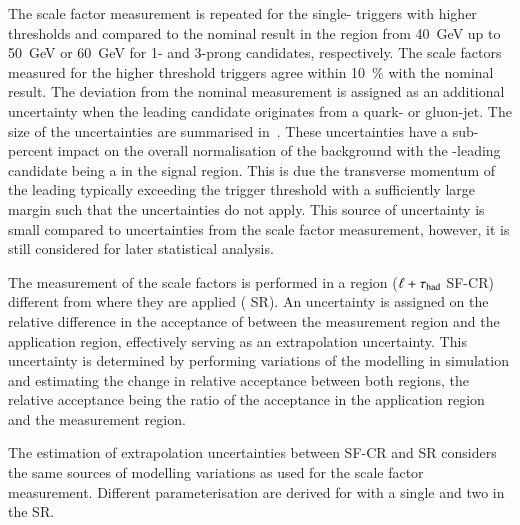 The scale factor measurement is repeated for the single-\tauhadvis
triggers with higher thresholds and compared to the nominal result in
the \faketauhadvis \pT region from \SI{40}{\GeV} up to \SI{50}{\GeV}
or \SI{60}{\GeV} for 1- and 3-prong candidates, respectively. The
scale factors measured for the higher threshold triggers agree within
\SI{10}{\percent} with the nominal result. The deviation from the
nominal measurement is assigned as an additional uncertainty when the
leading \tauhadvis candidate originates from a quark- or
gluon-jet. The size of the uncertainties are summarised
in~. These uncertainties have a
sub-percent impact on the overall normalisation of the \ttbarFakes
background with the \pT-leading \tauhadvis candidate being a
\faketauhadvis in the \hadhad signal region. This is due the
transverse momentum of the leading \tauhadvis typically exceeding the
trigger threshold with a sufficiently large margin such that the
uncertainties do not apply. This source of uncertainty is small
compared to uncertainties from the scale factor measurement, however,
it is still considered for later statistical analysis.

\begin{table}[htbp]
  \centering

  \caption{Size of the uncertainty comparing scale factors measured
    for triggers with $\pTHLT > \SI{25}{\GeV}$ and
    $\pTHLT > \SI{35}{\GeV}$ thresholds. The uncertainty is given
    relative to all events from \ttbar in the \hadhad channel signal
    region where the leading \tauhadvis is a \faketauhadvis with \pT
    close to the \SI{40}{\GeV} threshold.}%
  \label{tab:ttbarSF_tau25_35_uncertainty}

  
\end{table}

The measurement of the scale factors is performed in a region
($\ell+\tau_{\text{had}}$ SF-CR) different from where they are applied (\hadhad
SR). An uncertainty is assigned on the relative difference in the
acceptance of \ttbarFakes between the measurement region and the
application region, effectively serving as an extrapolation
uncertainty. This uncertainty is determined by performing variations
of the \ttbar modelling in simulation and estimating the change in
relative acceptance between both regions, the relative acceptance
being the ratio of the acceptance in the application region and the
measurement region.

The estimation of extrapolation uncertainties between SF-CR and
\hadhad SR considers the same sources of \ttbar modelling variations
as used for the scale factor measurement. Different parameterisation
are derived for \ttbar with a single \faketauhadvis and two
\faketauhadvis in the \hadhad SR.


